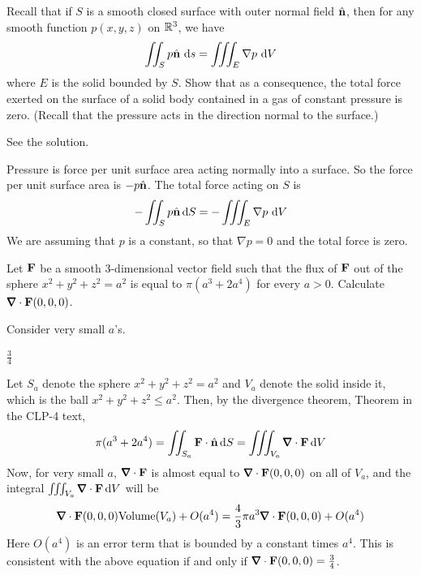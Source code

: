 \begin{question}[M317 2004A] %
Recall that if $S$ is a smooth closed surface with outer
normal field $\hat{\mathbf{n}}$, then for any smooth function $p(x,y,z)$ on $\mathbb{R}^3$,
we have
\begin{equation*}
\dblInt_S p\hn\ \dee{s}=\tripInt_E \nabla p\ \dee{V}
\end{equation*}
where $E$ is the solid bounded by $S$. Show that as a consequence,
the total force exerted on the surface of a solid body contained in a gas
of constant pressure is zero. (Recall that the pressure acts in the direction
normal to the surface.)
\end{question}


\begin{answer} 
See the solution.
\end{answer}

\begin{solution} 
Pressure is force per unit surface area acting normally into
a surface. So the force per unit surface area is $-p\hat{\mathbf{n}}$. The total force
acting on $S$ is
\begin{equation*}
-\iint_S p\hat{\mathbf{n}}\,\mathrm{d}S=-\iiint_E \nabla p\ \mathrm{d}V
\end{equation*}
We are assuming that $p$ is a constant, so that $\nabla p=0$ and the 
total force is zero.
\end{solution}

\begin{question}[M317 2002A] %
Let $\mathbf{F}$ be a smooth 3-dimensional
vector field such that the flux of $\mathbf{F}$ out of the sphere $x^2+y^2+z^2=a^2$
is equal to $\pi(a^3+2a^4)$ for every $a>0$. 
Calculate $\vnabla\cdot \vF(0,0,0)$.
\end{question}

\begin{hint} 
Consider very small $a$'s.
\end{hint}

\begin{answer} 
$\frac{3}{4}$
\end{answer}

\begin{solution} 
Let $S_a$ denote the sphere $x^2+y^2+z^2=a^2$
and $V_a$ denote the solid inside it, which is the ball 
$x^2+y^2+z^2\le a^2$. Then, by the divergence theorem, 
Theorem  in the CLP-4 text,
$$
\pi(a^3+2a^4)
=\dblInt_{S_a}\vF\cdot\hn\,\dee{S}
=\tripInt_{V_a}\vnabla\cdot\vF\,\dee{V}
$$
Now, for very small $a$, $\vnabla\cdot\vF$ is almost equal to 
$\vnabla\cdot\vF(0,0,0)$ on all of $V_a$, and
the integral  $\tripInt_{V_a}\vnabla\cdot\vF\,\dee{V}$
will be 
$$
\vnabla\cdot\vF(0,0,0){\rm Volume}(V_a)+O(a^4)
=\frac{4}{3}\pi a^3\vnabla\cdot\vF(0,0,0)+O(a^4)
$$
Here $O(a^4)$ is an error term that is bounded by a constant times $a^4$.
This is consistent with the above equation if and only if
$\vnabla\cdot\vF(0,0,0)=\frac{3}{4}$.
\end{solution}


